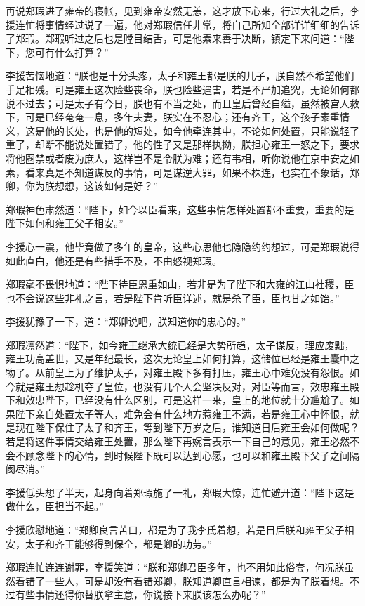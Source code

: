 再说郑瑕进了雍帝的寝帐，见到雍帝安然无恙，这才放下心来，行过大礼之后，李援连忙将事情经过说了一遍，他对郑瑕信任非常，将自己所知全部详详细细的告诉了郑瑕。郑瑕听过之后也是瞠目结舌，可是他素来善于决断，镇定下来问道：“陛下，您可有什么打算？”

李援苦恼地道：“朕也是十分头疼，太子和雍王都是朕的儿子，朕自然不希望他们手足相残。可是雍王这次险些丧命，朕也险些遇害，若是不严加追究，无论如何都说不过去；可是太子有今日，朕也有不当之处，而且皇后曾经自缢，虽然被宫人救下，可是已经奄奄一息，多年夫妻，朕实在不忍心；还有齐王，这个孩子素重情义，这是他的长处，也是他的短处，如今他牵连其中，不论如何处置，只能说轻了重了，却断不能说处置错了，他的性子又是那样执拗，朕担心雍王一怒之下，要求将他圈禁或者废为庶人，这样岂不是令朕为难；还有韦相，听你说他在京中安之如素，看来真是不知道谋反的事情，可是谋逆大罪，如果不株连，也实在不象话，郑卿，你为朕想想，这该如何是好？”

郑瑕神色肃然道：“陛下，如今以臣看来，这些事情怎样处置都不重要，重要的是陛下如何和雍王父子相安。”

李援心一震，他毕竟做了多年的皇帝，这些心思他也隐隐约约想过，可是郑瑕说得如此直白，他还是有些措手不及，不由怒视郑瑕。

郑瑕毫不畏惧地道：“陛下待臣恩重如山，若非是为了陛下和大雍的江山社稷，臣也不会说这些非礼之言，若是陛下肯听臣详述，就是杀了臣，臣也甘之如饴。”

李援犹豫了一下，道：“郑卿说吧，朕知道你的忠心的。”

郑瑕凛然道：“陛下，如今雍王继承大统已经是大势所趋，太子谋反，理应废黜，雍王功高盖世，又是年纪最长，这次无论皇上如何打算，这储位已经是雍王囊中之物了。从前皇上为了维护太子，对雍王殿下多有打压，雍王心中难免没有怨恨。如今就是雍王想趁机夺了皇位，也没有几个人会坚决反对，对臣等而言，效忠雍王殿下和效忠陛下，已经没有什么区别，可是这样一来，皇上的地位就十分尴尬了。如果陛下亲自处置太子等人，难免会有什么地方惹雍王不满，若是雍王心中怀恨，就是现在陛下保住了太子和齐王，等到陛下万岁之后，谁知道日后雍王会如何做呢？若是将这件事情交给雍王处置，那么陛下再婉言表示一下自己的意见，雍王必然不会不顾念陛下的心情，到时候陛下既可以达到心愿，也可以和雍王殿下父子之间隔阂尽消。”

李援低头想了半天，起身向着郑瑕施了一礼，郑瑕大惊，连忙避开道：“陛下这是做什么，臣担当不起。”

李援欣慰地道：“郑卿良言苦口，都是为了我李氏着想，若是日后朕和雍王父子相安，太子和齐王能够得到保全，都是卿的功劳。”

郑瑕连忙连连谢罪，李援笑道：“朕和郑卿君臣多年，也不用如此俗套，何况朕虽然看错了一些人，可是却没有看错郑卿，朕知道卿直言相谏，都是为了朕着想。不过有些事情还得你替朕拿主意，你说接下来朕该怎么办呢？”

